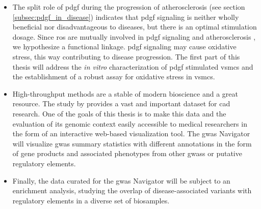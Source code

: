 \begin{itemize}
    \item The split role of \ac{pdgf} during the progression of atherosclerosis (see section \ref{subsec:pdgf_in_disease}) indicates that \ac{pdgf} signaling is neither wholly beneficial nor disadvantageous to diseases, but there is an optimal stimulation dosage. Since \ac{ros} are mutually involved in \ac{pdgf} signaling \cite{sundaresanRequirementGenerationH2O21995, bouziguesRegulationROSResponse2014a} and atherosclerosis \cite{burtenshawReactiveOxygenSpecies2019}, we hypothesize a functional linkage. \ac{pdgf} signaling may cause oxidative stress, this way contributing to disease progression. The first part of this thesis will address the \textit{in vitro} characterization of \ac{pdgf} stimulated \acp{vsmc} and the establishment of a robust assay for oxidative stress in \acp{vsmc}.
    \item High-throughput methods are a stable of modern bioscience and a great resource. The study by \textcite{aragamDiscoverySystematicCharacterization2021} provides a vast and important dataset for \ac{cad} research. One of the goals of this thesis is to make this data and the evaluation of its genomic context easily accessible to medical researchers in the form of an interactive web-based visualization tool. The \ac{gwas} Navigator will visualize \ac{gwas} summary statistics with different annotations in the form of gene products and associated phenotypes from other \acp{gwas} or putative regulatory elements.
    \item Finally, the data curated for the \ac{gwas} Navigator will be subject to an enrichment analysis, studying the overlap of disease-associated variants with regulatory elements in a diverse set of biosamples.
\end{itemize}
